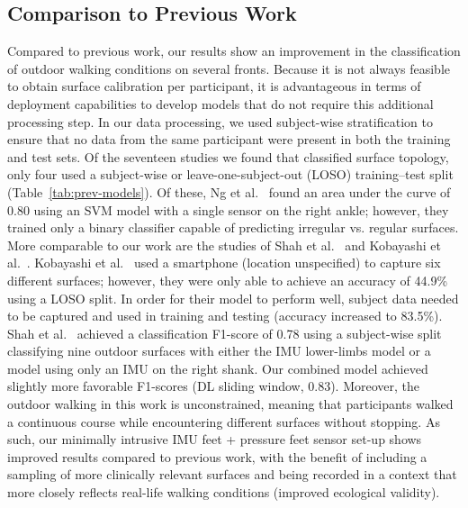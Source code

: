 \documentclass[sensors,article,accept,pdftex,moreauthors]{Definitions/mdpi}
\begin{document}

\subsection{Comparison to Previous Work}
Compared to previous work, our results show an improvement in the classification of outdoor walking conditions on several fronts.  Because it is not always feasible to obtain surface calibration per participant, it is advantageous in terms of deployment capabilities to develop models that do not require this additional processing step. In our data processing, we used subject-wise stratification to ensure that no data from the same participant were present in both the training and test sets. \textcolor{revision}{Of the seventeen studies we found that classified surface topology, only four used a subject-wise or leave-one-subject-out (LOSO) training--test split~\cite{Shah_2022, ng2022machine, kobayashi2019estimation, worsey2021automatic} (Table~\ref{tab:prev-models}). Of these, Ng et al.~\cite{ng2022machine} found an area under the curve of 0.80 using an SVM model with a single sensor on the right ankle; however, they trained only a binary classifier capable of predicting irregular vs. regular surfaces. More comparable to our work are the studies of Shah et al.~\cite{Shah_2022} and Kobayashi et al.~\cite{kobayashi2019estimation}. Kobayashi et al.~\cite{kobayashi2019estimation} used a smartphone (location unspecified) to capture six different surfaces; however, they were only able to achieve an accuracy of 44.9\% using a LOSO split. In order for their model to perform well, subject data needed to be captured and used in training and testing (accuracy increased to 83.5\%). Shah et al.~\cite{Shah_2022} achieved a classification F1-score of 0.78 using a subject-wise split classifying nine outdoor surfaces with either the IMU lower-limbs model or a model using only an IMU on the right shank. Our combined model achieved slightly more favorable F1-scores (DL sliding window, 0.83). Moreover, the outdoor walking in this work is unconstrained, meaning that participants walked a continuous course while encountering different surfaces without stopping.}
\textcolor{revision}{As such, our minimally intrusive IMU feet + pressure feet sensor set-up} shows improved results compared to previous work, with the benefit of including a sampling of more clinically relevant surfaces and being recorded in a context that more closely reflects real-life walking conditions (improved ecological validity).
\end{document}
